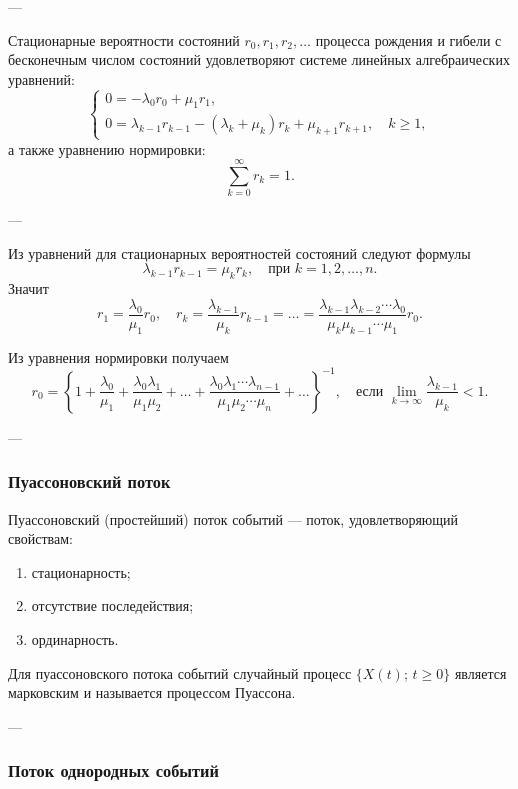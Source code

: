 ---

Стационарные вероятности состояний $r_0, r_1, r_2, \ldots$ процесса рождения и гибели
с бесконечным числом состояний удовлетворяют системе линейных алгебраических уравнений:
\[
	\begin{cases}
		0 = -\lambda_0 r_0 + \mu_1 r_1, \\[6pt]
		0 = \lambda_{k-1} r_{k-1} - (\lambda_k + \mu_k) r_k + \mu_{k+1} r_{k+1}, \quad k \ge 1,
	\end{cases}
\]
а также уравнению нормировки:
\[
	\sum_{k=0}^{\infty} r_k = 1.
\]

---

Из уравнений для стационарных вероятностей состояний следуют формулы
\[
	\lambda_{k-1} r_{k-1} = \mu_k r_k, \quad \text{при } k = 1, 2, \ldots, n.
\]
Значит
\[
	r_1 = \frac{\lambda_0}{\mu_1} r_0, \quad
	r_k = \frac{\lambda_{k-1}}{\mu_k} r_{k-1}
	= \ldots =
	\frac{\lambda_{k-1} \lambda_{k-2} \cdots \lambda_0}{\mu_k \mu_{k-1} \cdots \mu_1} r_0.
\]

Из уравнения нормировки получаем
\[
	r_0 =
	\left\{
	1 +
	\frac{\lambda_0}{\mu_1} +
	\frac{\lambda_0 \lambda_1}{\mu_1 \mu_2} +
	\ldots +
	\frac{\lambda_0 \lambda_1 \cdots \lambda_{n-1}}{\mu_1 \mu_2 \cdots \mu_n}
	+ \ldots
	\right\}^{-1},
	\quad \text{если }
	\lim_{k \to \infty} \frac{\lambda_{k-1}}{\mu_k} < 1.
\]

---

\subsubsection*{Пуассоновский поток}

Пуассоновский (простейший) поток событий — поток, удовлетворяющий свойствам:

\begin{enumerate}
	\item стационарность;
	\item отсутствие последействия;
	\item ординарность.
\end{enumerate}

Для пуассоновского потока событий случайный процесс
$\{ X(t); \, t \ge 0 \}$
является марковским и называется процессом Пуассона.

---

\subsubsection*{Поток однородных событий}

